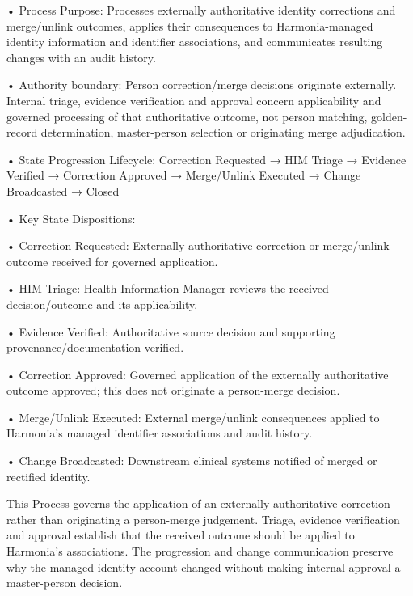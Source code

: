 •
Process Purpose: Processes externally authoritative identity corrections and merge/unlink outcomes, applies their consequences to Harmonia-managed identity information and identifier associations, and communicates resulting changes with an audit history.



•
Authority boundary: Person correction/merge decisions originate externally. Internal triage, evidence verification and approval concern applicability and governed processing of that authoritative outcome, not person matching, golden-record determination, master-person selection or originating merge adjudication.



•
State Progression Lifecycle: Correction Requested → HIM Triage → Evidence Verified → Correction Approved → Merge/Unlink Executed → Change Broadcasted → Closed



•
Key State Dispositions:



•
Correction Requested: Externally authoritative correction or merge/unlink outcome received for governed application.



•
HIM Triage: Health Information Manager reviews the received decision/outcome and its applicability.



•
Evidence Verified: Authoritative source decision and supporting provenance/documentation verified.



•
Correction Approved: Governed application of the externally authoritative outcome approved; this does not originate a person-merge decision.



•
Merge/Unlink Executed: External merge/unlink consequences applied to Harmonia's managed identifier associations and audit history.



•
Change Broadcasted: Downstream clinical systems notified of merged or rectified identity.



This Process governs the application of an externally authoritative correction rather than originating a person-merge judgement. Triage, evidence verification and approval establish that the received outcome should be applied to Harmonia's associations. The progression and change communication preserve why the managed identity account changed without making internal approval a master-person decision.


